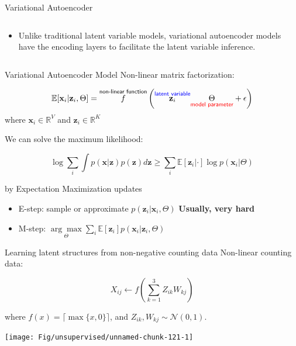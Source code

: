 \documentclass[
  ignorenonframetext,
  aspectratio=169]{beamer}
\providecommand{\tightlist}{%
  \setlength{\itemsep}{0pt}\setlength{\parskip}{0pt}}
\begin{document}
\begin{frame}{Variational Autoencoder}
\begin{columns}[T]
\begin{column}{.45\textwidth}
\normalsize

\begin{itemize}
\tightlist
\item
  Unlike traditional latent variable models, variational autoencoder
  models have the encoding layers to facilitate the latent variable
  inference.
\end{itemize}
\end{column}
\end{columns}
\end{frame}

\begin{frame}{Variational Autoencoder Model}
\protect\hypertarget{variational-autoencoder-model}{}
Non-linear matrix factorization:

\[\mathbb{E}\!\left[\mathbf{x}_{i} | \mathbf{z}_{i}, \Theta\right] = \overset{\textsf{non-linear function}}{f}
\left(\overset{\textsf{\color{blue} latent variable}}{\mathbf{z}_{i}} 
\underset{\textsf{\color{red} model parameter}}{\Theta} + \epsilon
\right)\] where \(\mathbf{x}_{i} \in \mathbb{R}^{V}\) and
\(\mathbf{z}_{i} \in \mathbb{R}^{K}\)

We can solve the maximum likelihood:

\[\log \sum_{i} \int p(\mathbf{x} | \mathbf{z}) p(\mathbf{z}) d \mathbf{z} 
\ge \sum_{i} \mathbb{E}\!\left[\mathbf{z}_{i}|\cdot\right] \log p(\mathbf{x}_{i}| \Theta)\]

by Expectation Maximization updates

\begin{itemize}
\item
  E-step: sample or approximate
  \(p(\mathbf{z}_{i}|\mathbf{x}_{i},\Theta)\) \textbf{Usually, very
  hard}
\item
  M-step:
  \(\underset{\Theta}{\arg\max} \sum_{i} \mathbb{E}\!\left[\mathbf{z}_{i}\right] p(\mathbf{x}_{i}| \mathbf{z}_{i}, \Theta)\)
\end{itemize}
\end{frame}

\begin{frame}{Learning latent structures from non-negative counting
data}
\protect\hypertarget{learning-latent-structures-from-non-negative-counting-data}{}
Non-linear counting data:

\[X_{ij} \gets f\left( \sum_{k=1}^{3} Z_{ik} W_{kj} \right)\]

where \(f(x) = \lceil \max\{x, 0\} \rceil\), and
\(Z_{ik},W_{kj} \sim \mathcal{N}\!\left(0,1\right)\).

\scriptsize

\normalsize

\scriptsize

\begin{center}\texttt{[image: Fig/unsupervised/unnamed-chunk-121-1]} \end{center}

\normalsize
\end{frame}
\end{document}
